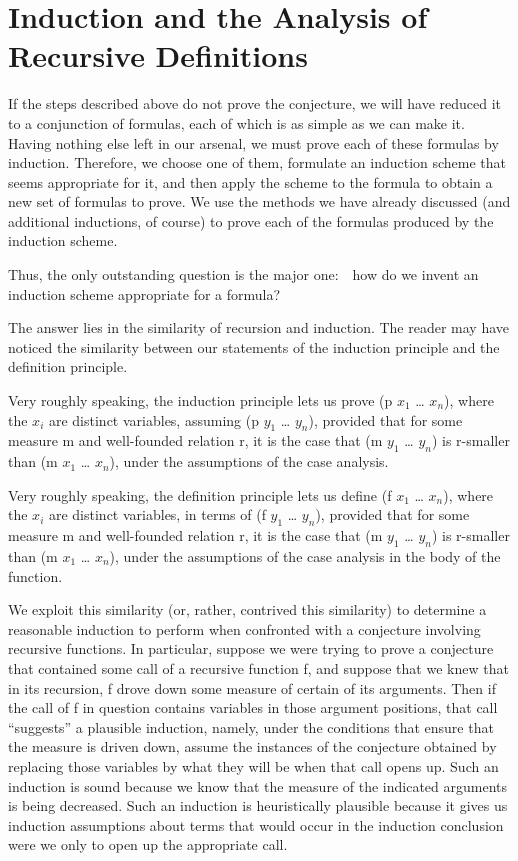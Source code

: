 \documentclass[11pt]{book}
\newcommand{\pubdefaulttextsize}{\large}
\begin{document}
\chapter{Induction and the Analysis of Recursive Definitions}
\label{SECRECURSION}
\pubdefaulttextsize
If the steps described above do not prove the conjecture, we will
have reduced it to a conjunction of formulas, each of which
is as simple as we can make it.  Having nothing else left in our arsenal,
we must prove each of these formulas by induction.  Therefore, we
choose one of them, formulate an induction scheme that seems
appropriate for it, and then apply the scheme to the formula
to obtain a new set of formulas to prove.  We use the
methods we have already discussed (and additional inductions, of
course) to prove each of the formulas produced by the induction
scheme.

Thus, the only outstanding question is the major one:~~how do
we invent an induction scheme appropriate for a formula?

The answer lies in the similarity of  recursion and induction.
The reader may have noticed the similarity between our statements
of the induction principle and the definition principle.

Very roughly speaking,
the induction principle lets us
prove (p $x_{1}$ \ldots{} $x_{n}$), where the $x_{i}$ are distinct variables,
assuming (p $y_{1}$ \ldots{} $y_{n}$), provided that for some
measure m and well-founded relation r, it is the case that
(m $y_{1}$ \ldots{} $y_{n}$) is r-smaller than (m $x_{1}$ \ldots{} $x_{n}$), under the assumptions
of the case analysis.

Very roughly speaking,
the definition principle lets us define
(f $x_{1}$ \ldots{} $x_{n}$), where the $x_{i}$ are distinct variables,
in terms of (f $y_{1}$ \ldots{} $y_{n}$), provided that for some
measure m and well-founded relation r, it is the case that
(m $y_{1}$ \ldots{} $y_{n}$) is r-smaller than (m $x_{1}$ \ldots{} $x_{n}$), under the assumptions
of the case analysis in the body of the function.

We
exploit this similarity (or, rather, contrived this similarity)
to determine a reasonable induction to
perform when confronted with a conjecture involving recursive functions.
In particular, suppose we were trying to prove a conjecture that
contained some call of a recursive function f, and suppose that we
knew that in its recursion, f drove down some measure of certain
of its arguments.  Then if the call of f in question contains
variables in those argument positions, that call ``suggests'' a plausible
induction,  namely, under the conditions that ensure that the measure
is driven down, assume the instances of the conjecture obtained by replacing
those variables by
what they will be when that call opens up.  Such an induction is sound because we know
that the measure of the indicated arguments is being decreased.
Such an induction is heuristically plausible because it gives us  induction assumptions
about terms that would occur in the induction conclusion
were we only to open up the appropriate call.
\end{document}
